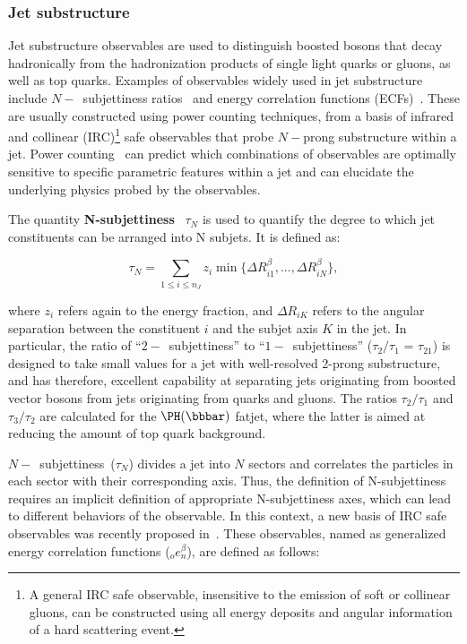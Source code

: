 \subsubsection{Jet substructure}
\label{sec:substructure}

Jet substructure observables are used to distinguish boosted \PH bosons that decay hadronically from the hadronization products of single light quarks or gluons,
as well as top quarks.
Examples of observables widely used in jet substructure include $N-$~subjettiness ratios~\cite{Thaler:2010tr} and energy correlation functions (ECFs)~\cite{Larkoski:2013eya}.
These are usually constructed using power counting techniques, from a basis of infrared and collinear (IRC)\footnote{A general
IRC safe observable, insensitive to the emission of soft or collinear gluons, can be constructed using all energy deposits and angular information of a hard scattering event.}
safe observables that probe $N-$prong substructure within a jet.
Power counting~\cite{Larkoski:2014gra} can predict which combinations of observables are optimally sensitive to specific parametric features within a jet and can elucidate the underlying physics probed by the observables.

The quantity \textbf{N-subjettiness}~\cite{Thaler:2010tr,Thaler:2011gf,Stewart:2010tn} $\tau_N$ is used to quantify the degree to which jet constituents can be arranged into N subjets. It is defined as:

\begin{equation}
\tau_{N} = \sum_{1 \leq i \leq n_{J}}{z_{i} \min\{\Delta R_{i1}^{\beta},...,\Delta R_{iN}^{\beta}\}},
\end{equation}

where $z_{i}$ refers again to the energy fraction, and $\Delta R_{iK}$ refers to the angular separation between the constituent $i$ and the subjet axis $K$ in the jet. In particular, the ratio of ``$2-$~subjettiness'' to ``$1-$~subjettiness'' ($\tau_{2}/\tau_{1}$ = $\tau_{21}$) is designed to take small values for a jet with well-resolved 2-prong substructure, and has therefore, excellent capability at separating jets originating from boosted vector bosons from jets originating from quarks and gluons. The ratios $\tau_2/\tau_1$ and $\tau_3/\tau_2$ are calculated for the $\PH(\bbbar)$ fatjet, where the latter is aimed at reducing the amount of top quark background.

$N-$~subjettiness~($\tau_{N}$) divides a jet into $N$ sectors and correlates the particles in each sector with their corresponding axis. 
Thus, the definition of N-subjettiness requires an implicit definition of appropriate N-subjettiness axes, which can lead to different behaviors of the observable. In this context,
a new basis of IRC safe observables was recently proposed in~\cite{Moult:2016cvt}. These observables, named as generalized energy correlation functions ($_{o}e_{n}^{\beta}$), are defined as follows:

